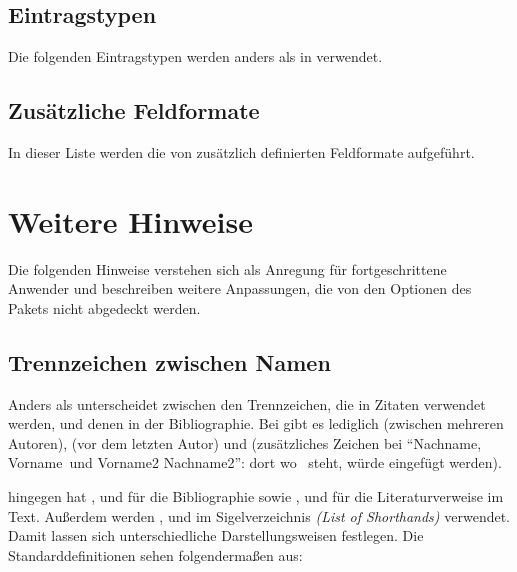 \documentclass[ngerman]{scrartcl}
\begin{document}
\subsection{Eintragstypen}
Die folgenden Eintragstypen werden anders als in \bl{} verwendet.
  
\subsection{Zusätzliche Feldformate}
In dieser Liste werden die von \bldw{} zusätzlich definierten Feldformate 
aufgeführt.
        

\section{Weitere Hinweise}
\label{weitere-anpassungen}
Die folgenden Hinweise verstehen sich als Anregung für fortgeschrittene Anwender
und beschreiben weitere Anpassungen, die von den Optionen des Pakets \bldw{}
nicht abgedeckt werden.

\subsection{Trennzeichen zwischen Namen}
Anders als \bl{} unterscheidet \bldw{} zwischen den Trennzeichen, die in 
Zitaten verwendet werden, und denen in der Bibliographie. Bei \bl{} gibt es 
lediglich  (zwischen mehreren Autoren), 
 (vor dem letzten Autor) und 
(zusätzliches Zeichen bei \enquote{Nachname, Vorname\textbar\ und Vorname2 
Nachname2}: dort wo \textbar\ steht, würde  eingefügt
werden).

\bldw{} hingegen hat ,  und
 für die Bibliographie sowie , 
 und  für die Literaturverweise
im Text. Außerdem werden ,  und
 im Sigelverzeichnis \emph{(List of Shorthands)} verwendet.
Damit lassen sich unterschiedliche Darstellungsweisen festlegen. Die
Standarddefinitionen sehen folgendermaßen aus:
\end{document}
